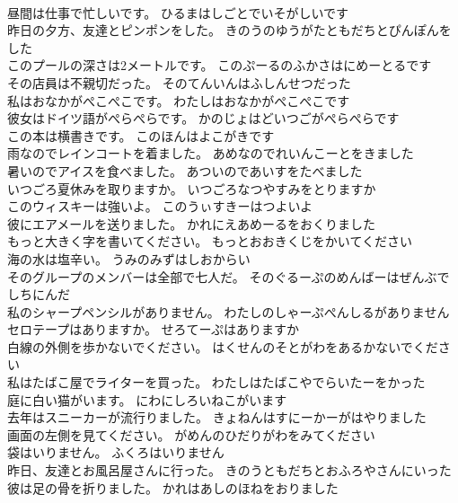 \documentclass[8pt]{extreport}
\begin{document}
\begin{CJK}{UTF8}{min}
\\	昼間は仕事で忙しいです。	ひるまはしごとでいそがしいです 
\\	昨日の夕方、友達とピンポンをした。	きのうのゆうがたともだちとぴんぽんをした 
\\	このプールの深さは2メートルです。	このぷーるのふかさはにめーとるです 
\\	その店員は不親切だった。	そのてんいんはふしんせつだった 
\\	私はおなかがぺこぺこです。	わたしはおなかがぺこぺこです 
\\	彼女はドイツ語がぺらぺらです。	かのじょはどいつごがぺらぺらです 
\\	この本は横書きです。	このほんはよこがきです 
\\	雨なのでレインコートを着ました。	あめなのでれいんこーとをきました 
\\	暑いのでアイスを食べました。	あついのであいすをたべました 
\\	いつごろ夏休みを取りますか。	いつごろなつやすみをとりますか 
\\	このウィスキーは強いよ。	このうぃすきーはつよいよ 
\\	彼にエアメールを送りました。	かれにえあめーるをおくりました 
\\	もっと大きく字を書いてください。	もっとおおきくじをかいてください 
\\	海の水は塩辛い。	うみのみずはしおからい 
\\	そのグループのメンバーは全部で七人だ。	そのぐるーぷのめんばーはぜんぶでしちにんだ 
\\	私のシャープペンシルがありません。	わたしのしゃーぷぺんしるがありません 
\\	セロテープはありますか。	せろてーぷはありますか 
\\	白線の外側を歩かないでください。	はくせんのそとがわをあるかないでください 
\\	私はたばこ屋でライターを買った。	わたしはたばこやでらいたーをかった 
\\	庭に白い猫がいます。	にわにしろいねこがいます 
\\	去年はスニーカーが流行りました。	きょねんはすにーかーがはやりました 
\\	画面の左側を見てください。	がめんのひだりがわをみてください 
\\	袋はいりません。	ふくろはいりません 
\\	昨日、友達とお風呂屋さんに行った。	きのうともだちとおふろやさんにいった 
\\	彼は足の骨を折りました。	かれはあしのほねをおりました 

\end{CJK}
\end{document}
